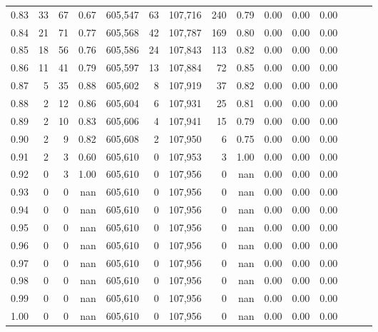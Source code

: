 \begin{tabular}{rrrrrrrrrrrrrrr}
0.83 &      33 &     67 &  0.67 &  605,547 &       63 &  107,716 &      240 &  0.79 &  0.00 &  0.00 &      0.00 \\
0.84 &      21 &     71 &  0.77 &  605,568 &       42 &  107,787 &      169 &  0.80 &  0.00 &  0.00 &      0.00 \\
0.85 &      18 &     56 &  0.76 &  605,586 &       24 &  107,843 &      113 &  0.82 &  0.00 &  0.00 &      0.00 \\
0.86 &      11 &     41 &  0.79 &  605,597 &       13 &  107,884 &       72 &  0.85 &  0.00 &  0.00 &      0.00 \\
0.87 &       5 &     35 &  0.88 &  605,602 &        8 &  107,919 &       37 &  0.82 &  0.00 &  0.00 &      0.00 \\
0.88 &       2 &     12 &  0.86 &  605,604 &        6 &  107,931 &       25 &  0.81 &  0.00 &  0.00 &      0.00 \\
0.89 &       2 &     10 &  0.83 &  605,606 &        4 &  107,941 &       15 &  0.79 &  0.00 &  0.00 &      0.00 \\
0.90 &       2 &      9 &  0.82 &  605,608 &        2 &  107,950 &        6 &  0.75 &  0.00 &  0.00 &      0.00 \\
0.91 &       2 &      3 &  0.60 &  605,610 &        0 &  107,953 &        3 &  1.00 &  0.00 &  0.00 &      0.00 \\
0.92 &       0 &      3 &  1.00 &  605,610 &        0 &  107,956 &        0 &   nan &  0.00 &  0.00 &      0.00 \\
0.93 &       0 &      0 &   nan &  605,610 &        0 &  107,956 &        0 &   nan &  0.00 &  0.00 &      0.00 \\
0.94 &       0 &      0 &   nan &  605,610 &        0 &  107,956 &        0 &   nan &  0.00 &  0.00 &      0.00 \\
0.95 &       0 &      0 &   nan &  605,610 &        0 &  107,956 &        0 &   nan &  0.00 &  0.00 &      0.00 \\
0.96 &       0 &      0 &   nan &  605,610 &        0 &  107,956 &        0 &   nan &  0.00 &  0.00 &      0.00 \\
0.97 &       0 &      0 &   nan &  605,610 &        0 &  107,956 &        0 &   nan &  0.00 &  0.00 &      0.00 \\
0.98 &       0 &      0 &   nan &  605,610 &        0 &  107,956 &        0 &   nan &  0.00 &  0.00 &      0.00 \\
0.99 &       0 &      0 &   nan &  605,610 &        0 &  107,956 &        0 &   nan &  0.00 &  0.00 &      0.00 \\
1.00 &       0 &      0 &   nan &  605,610 &        0 &  107,956 &        0 &   nan &  0.00 &  0.00 &      0.00 \\
\bottomrule
\end{tabular}
